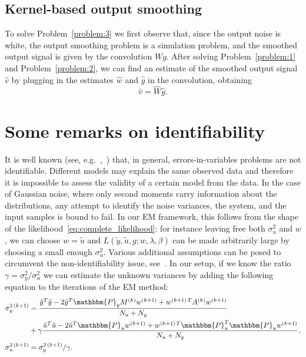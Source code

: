 \documentclass[10pt]{article}
\renewcommand{\P}{\mathbbm{P}}
\begin{document}
\subsection{Kernel-based output smoothing}\label{sec:output}
To solve Problem~\ref{problem:3} we first observe that, since the output noise
is white, the output smoothing problem is a simulation problem, and the
smoothed output signal is given by the convolution $Wg$.
After solving Problem~\ref{problem:1} and Problem~\ref{problem:2}, we can find
an estimate of the smoothed output signal $\hat v$ by plugging in the
estimates $\hat w$ and $\hat g$ in the convolution, obtaining
\begin{equation}
  \hat v= \hat W\hat g.
\end{equation}

\section{Some remarks on identifiability}\label{sec:identifiability}
It is well known (see, e.g.~\cite{bottegal2011identifiability},~\cite{soederstroem2002perspectives}) that, in general,
errors-in-variables problems are not identifiable. Different
models may explain the same observed data and therefore it is impossible to
assess the validity of a certain model from the data. In the case of Gaussian
noise, where only
second moments carry information about the distributions, any attempt to
identify the noise variances, the system, and the input samples is bound to
fail.  In our EM framework, this follows from the shape of the likelihood~\eqref{eq:complete_likelihood}: for instance leaving free both $\sigma_u^2$ and
$w$,  we can choose $w=\tilde u$ and $L(\tilde{y},\tilde{u},g;w,\lambda,\beta)$
can be made arbitrarily large by choosing a small enough $\sigma_u^2$. Various
additional assumptions can be posed to circumvent the non-identifiability
issue, see~\cite{soederstroem2007errors}. In our setup, if we know the ratio
$\gamma = \sigma_y^2/\sigma_u^2$ we can estimate the unknown variances by
adding the following equation to the iterations of the EM method: \begin{align}
  \sigma_y^{2\,(k+1)} &= \frac{\tilde y^T\tilde y - 2\tilde y^T
  \P_y M^{(k)}w^{(k+1)} + w^{(k+1)\,T}A^{(k)}w^{(k+1)}}{N_u+N_y}\nonumber\\ &
  + \gamma\frac{\tilde u^T\tilde u - 2\tilde u^T\P_u w^{(k+1)} +
  w^{(k+1)\,T}\P_u^T\P_u w^{(k+1)}}{N_u+N_y},\nonumber\\
  \sigma_u^{2\,(k+1)} &=
\sigma_y^{2\,(k+1)}/\gamma.\label{eq:noisecov} \end{align}
\end{document}
